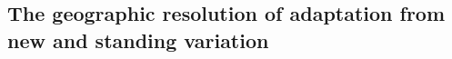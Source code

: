 \documentclass{article}
\begin{document}






\subsection{The geographic resolution of adaptation from new and standing variation}

\end{document}
